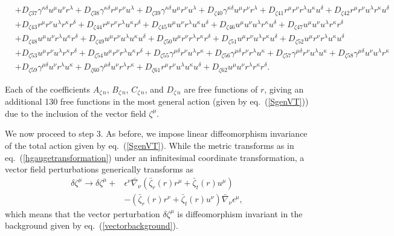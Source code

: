 \documentclass[10pt,twocolumn,preprintnumbers,amsmath,amssymb,nofootinbib
,superscriptaddress]{revtex4-1}
\begin{document}
{\begin{widetext}
\begin{align}
 &+D_{\zeta37}\gamma^{\kappa\delta}u^\mu u^\nu r^\lambda+D_{\zeta38}\gamma^{\kappa\delta}r^\mu r^\nu u^\lambda +D_{\zeta39}\gamma^{\kappa\delta}u^\mu r^\nu u^\lambda+D_{\zeta40}\gamma^{\kappa\delta}u^\mu r^\nu r^\lambda +D_{\zeta41}r^\mu r^\nu r^\lambda u^\kappa u^\delta +D_{\zeta42}r^\mu r^\nu u^\lambda r^\kappa u^\delta\nonumber\\
 & +D_{\zeta43}r^\mu r^\nu u^\lambda r^\kappa r^\delta +D_{\zeta44}r^\mu r^\nu r^\lambda u^\kappa r^\delta +D_{\zeta45}u^\mu u^\nu r^\lambda u^\kappa u^\delta +D_{\zeta46}u^\mu u^\nu u^\lambda r^\kappa u^\delta +D_{\zeta47}u^\mu u^\nu u^\lambda r^\kappa r^\delta \nonumber\\
 &+D_{\zeta48}u^\mu u^\nu r^\lambda u^\kappa r^\delta +D_{\zeta49}u^\mu r^\nu u^\lambda u^\kappa u^\delta +D_{\zeta50}u^\mu r^\nu r^\lambda r^\kappa r^\delta +D_{\zeta51}u^\mu r^\nu u^\lambda r^\kappa u^\delta +D_{\zeta52}u^\mu r^\nu r^\lambda u^\kappa u^\delta \nonumber\\
 &+D_{\zeta53}u^\mu r^\nu u^\lambda r^\kappa r^\delta +D_{\zeta54}u^\mu r^\nu r^\lambda u^\kappa r^\delta +D_{\zeta55}\gamma^{\mu\delta}r^\nu u^\lambda r^\kappa +D_{\zeta56}\gamma^{\mu\delta}r^\nu r^\lambda u^\kappa +D_{\zeta57}\gamma^{\mu\delta} r^\nu u^\lambda u^\kappa+D_{\zeta58}\gamma^{\mu\delta}u^\nu u^\lambda r^\kappa\nonumber\\
 &+D_{\zeta59}\gamma^{\mu\delta}u^\nu r^\lambda u^\kappa+D_{\zeta60}\gamma^{\mu\delta}u^\nu r^\lambda r^\kappa +D_{\zeta61}r^\mu r^\nu u^\lambda u^\kappa u^\delta +D_{\zeta62}u^\mu u^\nu r^\lambda r^\kappa r^\delta.
\end{align}
\end{widetext}
Each of the coefficients $A_{\zeta\,n}$, $B_{\zeta\,n}$, $C_{\zeta\,n}$, and $D_{\zeta\,n}$ are free functions of $r$, giving an additional 130 free functions in the most general action (given by eq.~(\ref{SgenVT})) due to the inclusion of the vector field $\zeta^\mu$.

We now proceed to step 3. As before, we impose linear diffeomorphism invariance of the total action given by eq.~(\ref{SgenVT}). While the metric transforms as in eq.~(\ref{hgaugetransformation}) under an infinitesimal coordinate transformation, a vector field perturbations generically transforms as
\begin{align}
\delta\zeta^\mu \rightarrow \delta\zeta^\mu +& \epsilon^\nu\bar{\nabla}_\nu\left(\bar{\zeta}_r(r)r^\mu+\bar{\zeta}_t(r)u^\mu\right)\nonumber\\
&-\left(\bar{\zeta}_r(r)r^\nu+\bar{\zeta}_t(r)u^\nu\right)\bar{\nabla}_\nu \epsilon^\mu, \label{vectorgaugetransformation}
\end{align}
which means that the vector perturbation $\delta\zeta^\mu$ is diffeomorphism invariant in the background given by eq.~(\ref{vectorbackground}).

}
\end{document}
